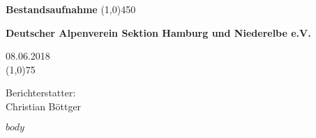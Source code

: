 \documentclass[12pt,a4paper]{scrartcl}
\begin{document}
\begin{titlepage}
\vspace{5cm}
  \begin{center}    
    \huge{\textbf{Bestandsaufnahme}}
    \line(1,0){450}

    \large{\textbf{Deutscher Alpenverein Sektion Hamburg und Niederelbe e.V.}}    
  \end{center}
  \begin{flushright}
    \vspace{9cm}
    08.06.2018 \\
    \line(1,0){75}
    
    Berichterstatter:\\ 
    Christian Böttger
  \end{flushright}
\end{titlepage}



$body$

% 

\begin{center}
\textasteriskcentered{}
\end{center}
  
\end{document}
